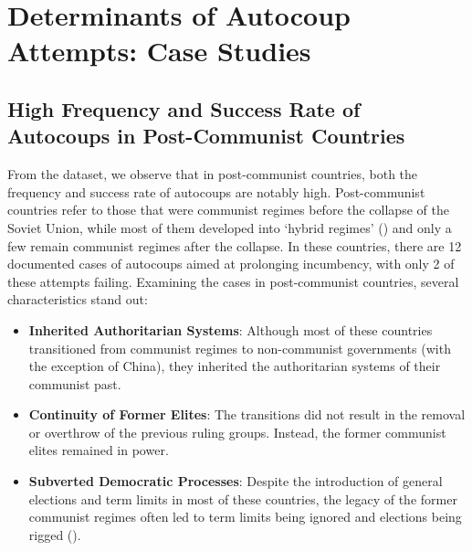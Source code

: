 \documentclass[
  12pt,
]{report}
\begin{document}
\endgroup

\section{Determinants of Autocoup Attempts: Case
Studies}\label{determinants-of-autocoup-attempts-case-studies}

\subsection{High Frequency and Success Rate of Autocoups in
Post-Communist
Countries}\label{high-frequency-and-success-rate-of-autocoups-in-post-communist-countries}

From the dataset, we observe that in post-communist countries, both the
frequency and success rate of autocoups are notably high. Post-communist
countries refer to those that were communist regimes before the collapse
of the Soviet Union, while most of them developed into `hybrid regimes'
() and only a few
remain communist regimes after the collapse. In these countries, there
are 12 documented cases of autocoups aimed at prolonging incumbency,
with only 2 of these attempts failing. Examining the cases in
post-communist countries, several characteristics stand out:

\begin{itemize}
\item
  \textbf{Inherited Authoritarian Systems}: Although most of these
  countries transitioned from communist regimes to non-communist
  governments (with the exception of China), they inherited the
  authoritarian systems of their communist past.
\item
  \textbf{Continuity of Former Elites}: The transitions did not result
  in the removal or overthrow of the previous ruling groups. Instead,
  the former communist elites remained in power.
\item
  \textbf{Subverted Democratic Processes}: Despite the introduction of
  general elections and term limits in most of these countries, the
  legacy of the former communist regimes often led to term limits being
  ignored and elections being rigged ().
\end{itemize}
\end{document}
